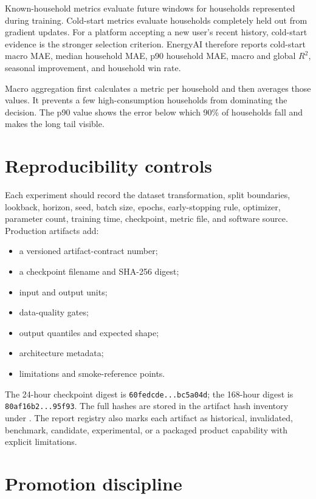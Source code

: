 Known-household metrics evaluate future windows for households represented during training. Cold-start metrics evaluate households completely held out from gradient updates. For a platform accepting a new user's recent history, cold-start evidence is the stronger selection criterion. EnergyAI therefore reports cold-start macro MAE, median household MAE, p90 household MAE, macro and global $R^2$, seasonal improvement, and household win rate.

Macro aggregation first calculates a metric per household and then averages those values. It prevents a few high-consumption households from dominating the decision. The p90 value shows the error below which 90\% of households fall and makes the long tail visible.

\section{Reproducibility controls}

Each experiment should record the dataset transformation, split boundaries, lookback, horizon, seed, batch size, epochs, early-stopping rule, optimizer, parameter count, training time, checkpoint, metric file, and software source. Production artifacts add:
\begin{itemize}
  \item a versioned artifact-contract number;
  \item a checkpoint filename and SHA-256 digest;
  \item input and output units;
  \item data-quality gates;
  \item output quantiles and expected shape;
  \item architecture metadata;
  \item limitations and smoke-reference points.
\end{itemize}

The 24-hour checkpoint digest is \texttt{60fedcde...bc5a04d}; the 168-hour digest is \texttt{80af16b2...95f93}. The full hashes are stored in the artifact hash inventory under . The report registry also marks each artifact as historical, invalidated, benchmark, candidate, experimental, or a packaged product capability with explicit limitations.

\section{Promotion discipline}

